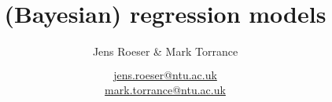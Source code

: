 \documentclass{slides}
\title{(Bayesian) regression models }
\author[Roeser]{Jens Roeser \& Mark Torrance\\ $\phantom{foo}$ \\ \url{jens.roeser@ntu.ac.uk}\\
\url{mark.torrance@ntu.ac.uk}	 }
\institute{Nottingham Trent University}
\date %
{}
\begin{document}
{
	\begin{frame}
		\titlepage
	\end{frame}
}






\end{document}
